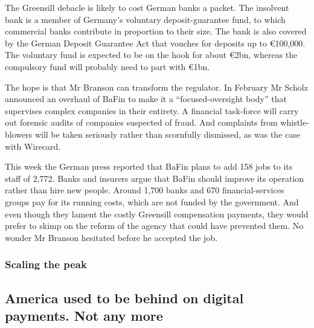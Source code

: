 \documentclass{article}
\begin{document}
The Greensill debacle is likely to cost German banks a packet. The insolvent bank is a member of Germany's voluntary deposit-guarantee fund, to which commercial banks contribute in proportion to their size. The bank is also covered by the German Deposit Guarantee Act that vouches for deposits up to €100,000. The voluntary fund is expected to be on the hook for about €2bn, whereas the compulsory fund will probably need to part with €1bn. 

The hope is that Mr Branson can transform the regulator. In February Mr Scholz announced an overhaul of BaFin to make it a ``focused-oversight body'' that supervises complex companies in their entirety. A financial task-force will carry out forensic audits of companies suspected of fraud. And complaints from whistle-blowers will be taken seriously rather than scornfully dismissed, as was the case with Wirecard. 

This week the German press reported that BaFin plans to add 158 jobs to its staff of 2,772. Banks and insurers argue that BaFin should improve its operation rather than hire new people. Around 1,700 banks and 670 financial-services groups pay for its running costs, which are not funded by the government. And even though they lament the costly Greensill compensation payments, they would prefer to skimp on the reform of the agency that could have prevented them. No wonder Mr Branson hesitated before he accepted the job. {} 
\clearpage
\subsubsection{Scaling the peak }
\subsection{America used to be behind on digital payments. Not any more }
\end{document}
